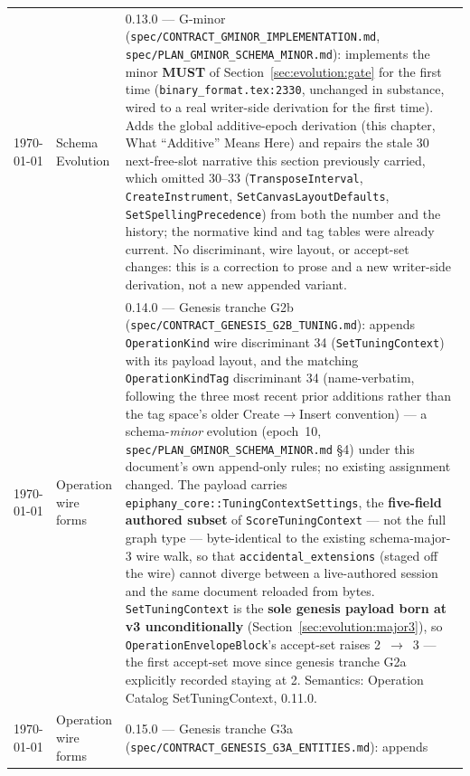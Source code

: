 \documentclass[11pt,letterpaper]{report}
\newcommand{\tablenums}[1]{{\addfontfeatures{Numbers={Lining,Tabular}}#1}}
\newcommand{\sectionsc}[1]{{\addfontfeatures{Letters=SmallCaps}#1}}
\newcommand{\MUST}{\textbf{MUST}}
\begin{document}
\begin{longtable}{p{2cm} p{2.5cm} p{9cm}}
    \today & Schema Evolution & 0.13.0 --- G-minor
  (\texttt{spec/CONTRACT\_GMINOR\_IMPLEMENTATION.md},
  \texttt{spec/PLAN\_GMINOR\_SCHEMA\_MINOR.md}): implements the minor
  \MUST{} of Section~\ref{sec:evolution:gate} for the first time
  (\texttt{binary\_format.tex:2330}, unchanged in substance, wired to a real
  writer-side derivation for the first time). Adds the global additive-epoch
  derivation (this chapter, \sectionsc{What ``Additive'' Means Here}) and
  repairs the stale \tablenums{30} next-free-slot narrative this section
  previously carried, which omitted \tablenums{30}--\tablenums{33}
  (\texttt{TransposeInterval}, \texttt{CreateInstrument},
  \texttt{SetCanvasLayoutDefaults}, \texttt{SetSpellingPrecedence}) from both
  the number and the history; the normative kind and tag tables were already
  current. No discriminant, wire layout, or accept-set changes: this is a
  correction to prose and a new writer-side derivation, not a new appended
  variant. \\
    \today & Operation wire forms & 0.14.0 --- Genesis tranche G2b
  (\texttt{spec/CONTRACT\_GENESIS\_G2B\_TUNING.md}): appends
  \texttt{OperationKind} wire discriminant \tablenums{34}
  (\texttt{SetTuningContext}) with its payload layout, and the matching
  \texttt{OperationKindTag} discriminant \tablenums{34} (name-verbatim,
  following the three most recent prior additions rather than the tag
  space's older Create$\rightarrow$Insert convention) --- a
  schema-\emph{minor} evolution (epoch~10,
  \texttt{spec/PLAN\_GMINOR\_SCHEMA\_MINOR.md} \S4) under this document's
  own append-only rules; no existing assignment changed. The payload
  carries \texttt{epiphany\_core::TuningContextSettings}, the
  \textbf{five-field authored subset} of \texttt{ScoreTuningContext} ---
  not the full graph type --- byte-identical to the existing
  schema-major-3 wire walk, so that \texttt{accidental\_extensions}
  (staged off the wire) cannot diverge between a live-authored session and
  the same document reloaded from bytes. \texttt{SetTuningContext} is the
  \textbf{sole genesis payload born at v3 unconditionally}
  (Section~\ref{sec:evolution:major3}), so \texttt{OperationEnvelopeBlock}'s
  accept-set raises \tablenums{2}~$\rightarrow$~\tablenums{3} --- the
  first accept-set move since genesis tranche G2a explicitly recorded
  staying at \tablenums{2}. Semantics: Operation Catalog
  \sectionsc{SetTuningContext}, 0.11.0. \\
    \today & Operation wire forms & 0.15.0 --- Genesis tranche G3a
  (\texttt{spec/CONTRACT\_GENESIS\_G3A\_ENTITIES.md}): appends

\end{longtable}
\end{document}
